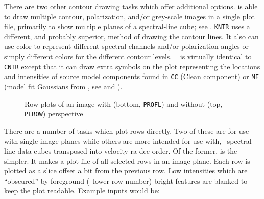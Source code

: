      There are two other contour drawing tasks which offer additional
options.  {\tt {}} is able to draw multiple contour,
polarization, and/or grey-scale images in a single plot file,
primarily to show multiple planes of a spectral-line cube; see
.  {\tt KNTR} uses a different, and probably superior,
method of drawing the contour lines.  It also can use color to
represent different spectral channels and/or polarization angles or
simply different colors for the different contour levels.  {\tt
{}} is virtually identical to {\tt CNTR} except that it can
draw extra symbols on the plot representing the locations and
intensities of source model components found in {\tt CC} (Clean
component) or {\tt MF} (model fit Gaussians from {\tt {}}, see
 and ).


\begin{figure}
\centering
\vfill
\label{fig:rowplot}
\caption[Row plots of an image]{Row plots of an image with (bottom,
   {\tt PROFL}) and without (top, {\tt PLROW}) perspective}
\end{figure}

     There are a number of tasks which plot rows directly.  Two of
these are for use with single image planes while others are more
intended for use with, \eg\ spectral-line data cubes transposed into
velocity-ra-dec order.  Of the former, {\tt {}} is the
simpler.  It makes a plot file of all selected rows in an image plane.
Each row is plotted as a slice offset a bit from the previous row.
Low intensities which are ``obscured'' by foreground (\ie\ lower row
number) bright features are blanked to keep the plot readable.
Example inputs would be:

